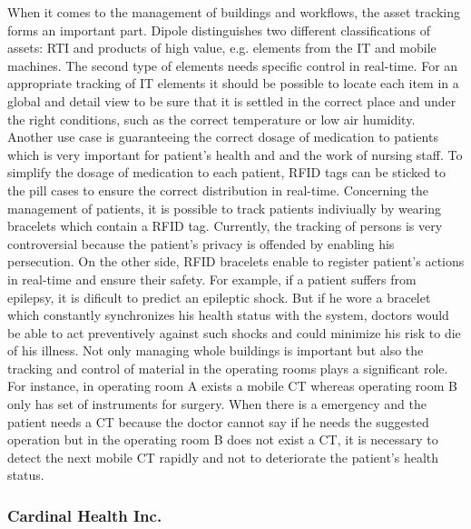 When it comes to the management of buildings and workflows, the asset tracking forms an important part. Dipole distinguishes two different classifications of assets: \ac{RTI} and products of high value, e.g. elements from the IT and mobile machines. The second type of elements needs specific control in real-time. For an appropriate tracking of IT elements it should be possible to locate each item in a global and detail view to be sure that it is settled in the correct place and under the right conditions, such as the correct temperature or low air humidity.
Another use case is guaranteeing the correct dosage of medication to patients which is very important for patient's health and and the work of nursing staff. To simplify the dosage of medication to each patient, RFID tags can be sticked to the pill cases to ensure the correct distribution in real-time. 
Concerning the management of patients, it is possible to track patients indiviually by wearing bracelets which contain a RFID tag. Currently, the tracking of persons is very controversial because the patient's privacy is offended by enabling his persecution. On the other side, RFID bracelets enable to register patient's actions in real-time and ensure their safety. For example, if a patient suffers from epilepsy, it is dificult to predict an epileptic shock. But if he wore a bracelet which constantly synchronizes his health status with the system, doctors would be able to act preventively against such shocks and could minimize his risk to die of his illness.
Not only managing whole buildings is important but also the tracking and control of material in the operating rooms plays a significant role. For instance, in operating room A exists a mobile \ac{CT} whereas operating room B only has set of instruments for surgery. When there is a emergency and the patient needs a CT because the doctor cannot say if he needs the suggested operation but in the operating room B does not exist a CT, it is necessary to detect the next mobile CT rapidly and not to deteriorate the patient's health status. 

\subsubsection{Cardinal Health Inc.} \label{inventory}

